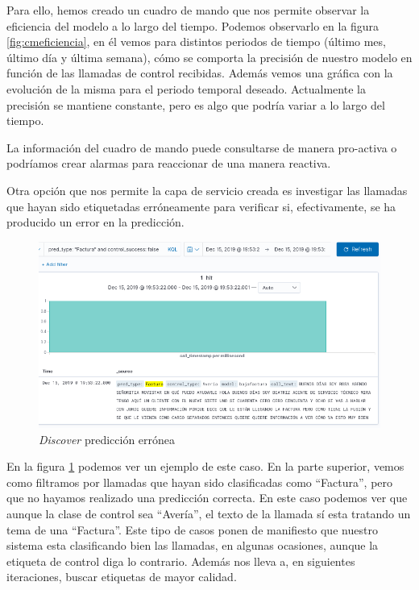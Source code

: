 Para ello, hemos creado un cuadro de mando que nos permite observar la eficiencia del modelo a lo largo del tiempo. Podemos observarlo en la figura \ref{fig:cmeficiencia}, en él vemos para distintos periodos de tiempo (último mes, último día y última semana), cómo se comporta la precisión de nuestro modelo en función de las llamadas de control recibidas. Además vemos una gráfica con la evolución de la misma para el periodo temporal deseado. Actualmente la precisión se mantiene constante, pero es algo que podría variar a lo largo del tiempo.

La información del cuadro de mando puede consultarse de manera pro-activa o podríamos crear alarmas para reaccionar de una manera reactiva. 


Otra opción que nos permite la capa de servicio creada es investigar las llamadas que hayan sido etiquetadas erróneamente para verificar si, efectivamente, se ha producido un error en la predicción.


\begin{figure}[!ht]
	\centering
	\includegraphics[width=1\textwidth]{images/mant/cm-error.png}
	\caption{\textit{Discover} predicción errónea}
	\label{fig:cm-error}
\end{figure}

En la figura \ref{fig:cm-error} podemos ver un ejemplo de este caso. En la parte superior, vemos como filtramos por llamadas que hayan sido clasificadas como ``Factura'', pero que no hayamos realizado una predicción correcta. En este caso podemos ver que aunque la clase de control sea ``Avería'', el texto de la llamada sí esta tratando un tema de una ``Factura''.  Este tipo de casos ponen de manifiesto que nuestro sistema esta clasificando bien las llamadas, en algunas ocasiones, aunque la etiqueta de control diga lo contrario. Además nos lleva a, en siguientes iteraciones, buscar etiquetas de mayor calidad.

